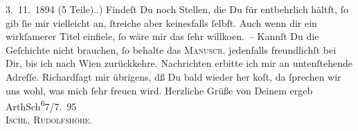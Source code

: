 \begin{ledgroupsized}[t]{13cm}
{{{                        3. 11. 1894 (5 Teile).}}}\label{K_L00463_1h}.) Findeſt Du noch Stellen,
               die Du für entbehrlich hältſt, ſo gib ſie mir vielleicht an, ſtreiche aber
               keinesfalls ſelbſt. {\pb}Auch wenn dir ein wirkſamerer Titel einfiele, ſo wäre mir das ſehr willko{\geminationm}en. –\pend
           \pstart
           Kannſt Du die Geſchichte nicht brauchen, ſo behalte das \textsc{Manuscr}. jedenfalls freundlichſt bei Dir, bis ich nach Wien zurückkehre. Nachrichten erbitte ich mir an untenſtehende
               Adreſſe. Richardſagt mir übrigens, dß Du bald
                  {\pb}wieder her ko{\geminationm}ſt, da ſprechen wir uns wohl, was mich ſehr freuen
               wird.\pend
           \pstart Herzliche Grüße von Deinem ergeb \spacefill\mbox{ArthSch}\pend{}\substVorne{}\textsuperscript{6}\substDazwischen{}7\substHinten{}/7. 95{\\}\textsc{Ischl, Rudolfshöhe.}\pend
           \endnumbering{}\end{ledgroupsized}  \newcommand{\dateiname}{L00463}\newcommand{\titel}{Arthur Schnitzler an Hermann Bahr, 17. 7. 1895}\newcommand{\editorInnen}{ Kurt Ifkovits,  Martin Anton Müller}
            \footnotesize
\begin{ledgroupsized}[t]{11.5cm}
\end{ledgroupsized}
         
      